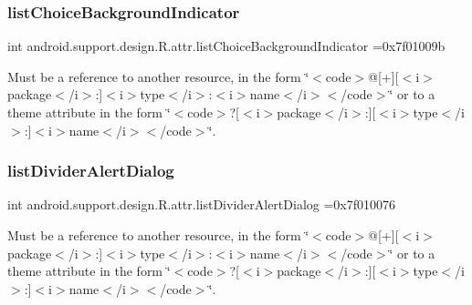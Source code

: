 \subsubsection{\texorpdfstring{list\+Choice\+Background\+Indicator}{listChoiceBackgroundIndicator}}
{\footnotesize\ttfamily int android.\+support.\+design.\+R.\+attr.\+list\+Choice\+Background\+Indicator =0x7f01009b\hspace{0.3cm}{\ttfamily [static]}}

Must be a reference to another resource, in the form \char`\"{}$<$code$>$@\mbox{[}+\mbox{]}\mbox{[}$<$i$>$package$<$/i$>$\+:\mbox{]}$<$i$>$type$<$/i$>$\+:$<$i$>$name$<$/i$>$$<$/code$>$\char`\"{} or to a theme attribute in the form \char`\"{}$<$code$>$?\mbox{[}$<$i$>$package$<$/i$>$\+:\mbox{]}\mbox{[}$<$i$>$type$<$/i$>$\+:\mbox{]}$<$i$>$name$<$/i$>$$<$/code$>$\char`\"{}. \mbox{\label{classandroid_1_1support_1_1design_1_1R_1_1attr_ae516939c27295fc709337c4f1d415514}} 
\subsubsection{\texorpdfstring{list\+Divider\+Alert\+Dialog}{listDividerAlertDialog}}
{\footnotesize\ttfamily int android.\+support.\+design.\+R.\+attr.\+list\+Divider\+Alert\+Dialog =0x7f010076\hspace{0.3cm}{\ttfamily [static]}}

Must be a reference to another resource, in the form \char`\"{}$<$code$>$@\mbox{[}+\mbox{]}\mbox{[}$<$i$>$package$<$/i$>$\+:\mbox{]}$<$i$>$type$<$/i$>$\+:$<$i$>$name$<$/i$>$$<$/code$>$\char`\"{} or to a theme attribute in the form \char`\"{}$<$code$>$?\mbox{[}$<$i$>$package$<$/i$>$\+:\mbox{]}\mbox{[}$<$i$>$type$<$/i$>$\+:\mbox{]}$<$i$>$name$<$/i$>$$<$/code$>$\char`\"{}. \mbox{\label{classandroid_1_1support_1_1design_1_1R_1_1attr_ad63c63d279d12a0e639383746d24e4fd}} 
